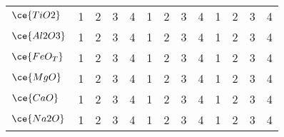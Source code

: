 \begin{table*}[]
{\begin{tabular}{l|cccc|cccc|cccc}
$\ce{TiO2}$  & \multicolumn{1}{c}{1}     & \multicolumn{1}{c}{2}           & \multicolumn{1}{c}{3}       & \multicolumn{1}{c|}{4}            & \multicolumn{1}{c}{1}     & \multicolumn{1}{c}{2}           & \multicolumn{1}{c}{3}       & \multicolumn{1}{c|}{4}            & \multicolumn{1}{c}{1}     & \multicolumn{1}{c}{2}           & \multicolumn{1}{c}{3}       & 4                             \\
$\ce{Al2O3}$ & \multicolumn{1}{c}{1}     & \multicolumn{1}{c}{2}           & \multicolumn{1}{c}{3}       & \multicolumn{1}{c|}{4}            & \multicolumn{1}{c}{1}     & \multicolumn{1}{c}{2}           & \multicolumn{1}{c}{3}       & \multicolumn{1}{c|}{4}            & \multicolumn{1}{c}{1}     & \multicolumn{1}{c}{2}           & \multicolumn{1}{c}{3}       & 4                             \\
$\ce{FeO_T}$ & \multicolumn{1}{c}{1}     & \multicolumn{1}{c}{2}           & \multicolumn{1}{c}{3}       & \multicolumn{1}{c|}{4}            & \multicolumn{1}{c}{1}     & \multicolumn{1}{c}{2}           & \multicolumn{1}{c}{3}       & \multicolumn{1}{c|}{4}            & \multicolumn{1}{c}{1}     & \multicolumn{1}{c}{2}           & \multicolumn{1}{c}{3}       & 4                             \\
$\ce{MgO}$   & \multicolumn{1}{c}{1}     & \multicolumn{1}{c}{2}           & \multicolumn{1}{c}{3}       & \multicolumn{1}{c|}{4}            & \multicolumn{1}{c}{1}     & \multicolumn{1}{c}{2}           & \multicolumn{1}{c}{3}       & \multicolumn{1}{c|}{4}            & \multicolumn{1}{c}{1}     & \multicolumn{1}{c}{2}           & \multicolumn{1}{c}{3}       & 4                             \\
$\ce{CaO}$   & \multicolumn{1}{c}{1}     & \multicolumn{1}{c}{2}           & \multicolumn{1}{c}{3}       & \multicolumn{1}{c|}{4}            & \multicolumn{1}{c}{1}     & \multicolumn{1}{c}{2}           & \multicolumn{1}{c}{3}       & \multicolumn{1}{c|}{4}            & \multicolumn{1}{c}{1}     & \multicolumn{1}{c}{2}           & \multicolumn{1}{c}{3}       & 4                             \\
$\ce{Na2O}$  & \multicolumn{1}{c}{1}     & \multicolumn{1}{c}{2}           & \multicolumn{1}{c}{3}       & \multicolumn{1}{c|}{4}            & \multicolumn{1}{c}{1}     & \multicolumn{1}{c}{2}           & \multicolumn{1}{c}{3}       & \multicolumn{1}{c|}{4}            & \multicolumn{1}{c}{1}     & \multicolumn{1}{c}{2}           & \multicolumn{1}{c}{3}       & 4                             \\

\end{tabular}}
\end{table*}
